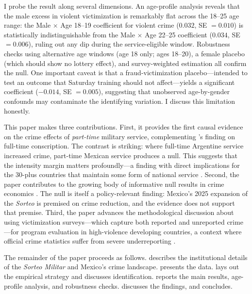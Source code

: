\documentclass[12pt]{article}
\begin{document}
I probe the result along several dimensions. An age-profile analysis reveals that the male excess in violent victimization is remarkably flat across the 18--25 age range: the Male $\times$ Age 18--19 coefficient for violent crime ($0.032$, SE $= 0.010$) is statistically indistinguishable from the Male $\times$ Age 22--25 coefficient ($0.034$, SE $= 0.006$), ruling out any dip during the service-eligible window. Robustness checks using alternative age windows (age 18 only; ages 18--20), a female placebo (which should show no lottery effect), and survey-weighted estimation all confirm the null. One important caveat is that a fraud-victimization placebo---intended to test an outcome that Saturday training should not affect---yields a significant coefficient ($-0.014$, SE $= 0.005$), suggesting that unobserved age-by-gender confounds may contaminate the identifying variation. I discuss this limitation honestly.

This paper makes three contributions. First, it provides the first causal evidence on the crime effects of \textit{part-time} military service, complementing \citet{galiani2011conscription}'s finding on full-time conscription. The contrast is striking: where full-time Argentine service increased crime, part-time Mexican service produces a null. This suggests that the intensity margin matters profoundly---a finding with direct implications for the 30-plus countries that maintain some form of national service \citep{delvecchio2017military}. Second, the paper contributes to the growing body of informative null results in crime economics \citep{chalfin2024police}. The null is itself a policy-relevant finding: Mexico's 2025 expansion of the \textit{Sorteo} is premised on crime reduction, and the evidence does not support that premise. Third, the paper advances the methodological discussion about using victimization surveys---which capture both reported and unreported crime---for program evaluation in high-violence developing countries, a context where official crime statistics suffer from severe underreporting \citep{inegi2024envipe}.

The remainder of the paper proceeds as follows.  describes the institutional details of the \textit{Sorteo Militar} and Mexico's crime landscape.  presents the data.  lays out the empirical strategy and discusses identification.  reports the main results, age-profile analysis, and robustness checks.  discusses the findings, and  concludes.
\end{document}
